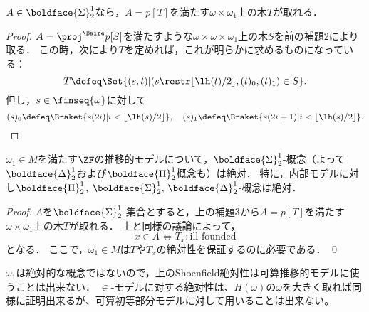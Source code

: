 \documentclass[a4j]{ltjsarticle}
\begin{document}
\begin{lemma}
 $A \in \boldface{\Sigma}^1_2$なら，$A = p[T]$を満たす$\omega \times \omega_1$上の木$T$が取れる．
\end{lemma}
\begin{proof}
 $A = \proj^{\Baire} p[S]$を満たすような$\omega \times \omega \times \omega_1$上の木$S$を前の補題2により取る．
 この時，次により$T$を定めれば，これが明らかに求めるものになっている：
 \[
  T \defeq \Set{(s, t) | (s \restr \lfloor \lh(t)/2 \rfloor, (t)_0, (t)_1) \in S}.
 \]
 但し，$s \in \finseq{\omega}$に対して
 \[
  (s)_0 \defeq \Braket{s(2i)   | i < \lfloor \lh(s)/2 \rfloor},\quad 
  (s)_1 \defeq \Braket{s(2i+1) | i < \lfloor \lh(s)/2 \rfloor}.
 \]
\end{proof}

\begin{theorem}
 $\omega_1 \in M$を満たす$\ZF$の推移的モデルについて，$\boldface{\Sigma}^1_2$-概念（よって$\boldface{\Delta}^1_2$および$\boldface{\Pi}^1_2$概念も）は絶対．
 特に，内部モデルに対し$\boldface{\Pi}^1_2$, $\boldface{\Sigma}^1_2$, $\boldface{\Delta}^1_2$-概念は絶対．
\end{theorem}
\begin{proof}
 $A$を$\boldface{\Sigma}^1_2$-集合とすると，上の補題3から$A = p[T]$を満たす$\omega \times \omega_1$上の木$T$が取れる．
 上と同様の議論によって，
 \[
  x \in A \iff T_x: \text{ill-founded}
 \]
 となる．
 ここで，$\omega_1 \in M$は$T$や$T_x$の絶対性を保証するのに必要である．
 \qed
\end{proof}

$\omega_1$は絶対的な概念ではないので，上のShoenfield絶対性は可算推移的モデルに使うことは出来ない．
$\in$-モデルに対する絶対性は、$H(\omega)$の$\omega$を大きく取れば同様に証明出来るが、可算初等部分モデルに対して用いることは出来ない。

\nocite{Kunen:2011,Jech:2002,Arai:2011,Kunen:2009}
\printbibliography[title=参考文献]
\end{document}
